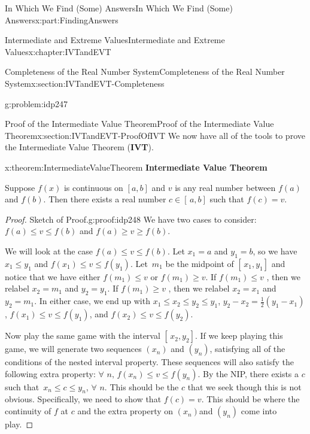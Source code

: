 \documentclass[oneside,10pt,]{book}
\newcommand{\terminology}[1]{\textbf{#1}}
\numberwithin{equation}{section}
\begin{document}
\begin{partptx}{In Which We Find (Some) Answers}{}{In Which We Find (Some) Answers}{}{}{x:part:FindingAnswers}
\begin{chapterptx}{Intermediate and Extreme Values}{}{Intermediate and Extreme Values}{}{}{x:chapter:IVTandEVT}
\begin{sectionptx}{Completeness of the Real Number System}{}{Completeness of the Real Number System}{}{}{x:section:IVTandEVT-Completeness}
\begin{problem}{}{g:problem:idp247}
\begin{enumerate}[font=\bfseries,label=(\alph*),ref=\alph*]
\end{enumerate}
\end{problem}
\end{sectionptx}
%
%
\typeout{************************************************}
\typeout{************************************************}
%
\begin{sectionptx}{Proof of the Intermediate Value Theorem}{}{Proof of the Intermediate Value Theorem}{}{}{x:section:IVTandEVT-ProofOfIVT}
We now have all of the tools to prove the Intermediate Value Theorem (\terminology{IVT}).%
\begin{theorem}{}{}{x:theorem:IntermediateValueTheorem}%
\terminology{Intermediate Value Theorem}%
\par
{} Suppose \(f(x)\) is continuous on \([a,b]\) and \(v\) is any real number between \(f(a)\) and \(f(b)\). Then there exists a real number \(c\in[\,a,b]\) such that \(f(c)=v\).%
\end{theorem}
\begin{proof}{Sketch of Proof.}{g:proof:idp248}
We have two cases to consider: \(f(a)\leq v\leq f(b)\) and \(f(a)\geq v\geq f(b)\).%
\par
We will look at the case \(f(a)\leq v\leq f(b)\). Let \(x_1=a\) and \(y_1=b\), so we have \(x_1\leq y_1\) and \(f(x_1)\leq v\leq f(y_1)\). Let \(\,m_1\) be the midpoint of \([\,x_1,y_1]\) and notice that we have either \(f(m_1)\leq v\) or \(f(m_1)\geq v\). If \(f(m_1)\leq v\) , then we relabel \(x_2=m_1\) and \(y_2=y_1\). If \(f(m_1)\geq v\) , then we relabel \(x_2=x_1\) and \(y_2=m_1\). In either case, we end up with \(x_1\leq x_2\leq y_2\leq y_1\), \(y_2-x_2=\frac{1}{2}\left(y_1-x_1\right)\), \(f(x_1)\leq v\leq f(y_1)\), and \(f(x_2)\leq v\leq f(y_2)\).%
\par
Now play the same game with the interval \([\,x_2,y_2]\). If we keep playing this game, we will generate two sequences \(\left(x_n\right)\) and \(\left(y_n\right)\), satisfying all of the conditions of the nested interval property. These sequences will also satisfy the following extra property: \(\forall\) \(n,\,f(x_n)\leq v\leq f(y_n)\). By the NIP, there exists a \(c\) such that \(\,x_n\leq c\leq y_n\), \(\forall\) \(n\). This should be the \(c\) that we seek though this is not obvious. Specifically, we need to show that \(f(c)=v\). This should be where the continuity of \(f\) at \(c\) and the extra property on \(\left(x_n\right)\)and \(\left(y_n\right)\) come into play.%
\end{proof}

\end{sectionptx}
\end{chapterptx}
\end{partptx}
\end{document}
